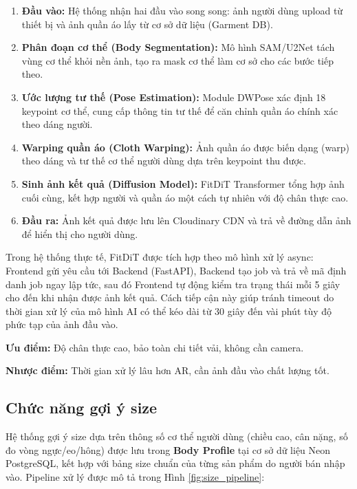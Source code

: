 \begin{enumerate}
    \item \textbf{Đầu vào:} Hệ thống nhận hai đầu vào song song: ảnh người dùng upload từ thiết bị và ảnh quần áo lấy từ cơ sở dữ liệu (Garment DB).
    \item \textbf{Phân đoạn cơ thể (Body Segmentation):} Mô hình SAM/U2Net tách vùng cơ thể khỏi nền ảnh, tạo ra mask cơ thể làm cơ sở cho các bước tiếp theo.
    \item \textbf{Ước lượng tư thế (Pose Estimation):} Module DWPose xác định 18 keypoint cơ thể, cung cấp thông tin tư thế để căn chỉnh quần áo chính xác theo dáng người.
    \item \textbf{Warping quần áo (Cloth Warping):} Ảnh quần áo được biến dạng (warp) theo dáng và tư thế cơ thể người dùng dựa trên keypoint thu được.
    \item \textbf{Sinh ảnh kết quả (Diffusion Model):} FitDiT Transformer tổng hợp ảnh cuối cùng, kết hợp người và quần áo một cách tự nhiên với độ chân thực cao.
    \item \textbf{Đầu ra:} Ảnh kết quả được lưu lên Cloudinary CDN và trả về đường dẫn ảnh để hiển thị cho người dùng.
\end{enumerate}

Trong hệ thống thực tế, FitDiT được tích hợp theo mô hình xử lý async: Frontend gửi yêu cầu tới Backend (FastAPI), Backend tạo job và trả về mã định danh job ngay lập tức, sau đó Frontend tự động kiểm tra trạng thái mỗi 5 giây cho đến khi nhận được ảnh kết quả. Cách tiếp cận này giúp tránh timeout do thời gian xử lý của mô hình AI có thể kéo dài từ 30 giây đến vài phút tùy độ phức tạp của ảnh đầu vào.

\noindent\textbf{Ưu điểm:} Độ chân thực cao, bảo toàn chi tiết vải, không cần camera.

\noindent\textbf{Nhược điểm:} Thời gian xử lý lâu hơn AR, cần ảnh đầu vào chất lượng tốt.

\subsection{Chức năng gợi ý size}
Hệ thống gợi ý size dựa trên thông số cơ thể người dùng (chiều cao, cân nặng, số đo vòng ngực/eo/hông) được lưu trong \textbf{Body Profile} tại cơ sở dữ liệu Neon PostgreSQL, kết hợp với bảng size chuẩn của từng sản phẩm do người bán nhập vào. Pipeline xử lý được mô tả trong Hình \ref{fig:size_pipeline}:

